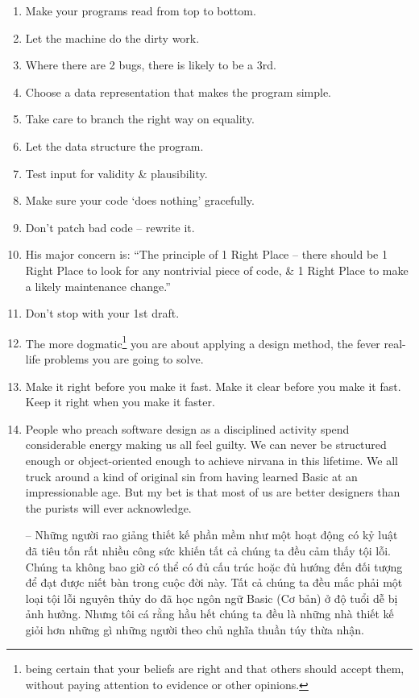 \documentclass{article}
\begin{document}
\begin{enumerate}
	\item Make your programs read from top to bottom.
	\item Let the machine do the dirty work.
	\item Where there are 2 bugs, there is likely to be a 3rd.
	\item Choose a data representation that makes the program simple.
	\item Take care to branch the right way on equality.
	\item Let the data structure the program.
	\item Test input for validity \& plausibility.
	\item Make sure your code `does nothing' gracefully.
	\item Don't patch bad code -- rewrite it.
	\item His major concern is: ``The principle of 1 Right Place -- there should be 1 Right Place to look for any nontrivial piece of code, \& 1 Right Place to make a likely maintenance change.''
	\item Don't stop with your 1st draft.
	\item The more dogmatic\footnote{being certain that your beliefs are right and that others should accept them, without paying attention to evidence or other opinions.} you are about applying a design method, the fever real-life problems you are going to solve.
	\item Make it right before you make it fast. Make it clear before you make it fast. Keep it right when you make it faster.
	\item People who preach software design as a disciplined activity spend considerable energy making us all feel guilty. We can never be structured enough or object-oriented enough to achieve nirvana in this lifetime. We all truck around a kind of original sin from having learned Basic at an impressionable age. But my bet is that most of us are better designers than the purists will ever acknowledge.
	
	-- Những người rao giảng thiết kế phần mềm như một hoạt động có kỷ luật đã tiêu tốn rất nhiều công sức khiến tất cả chúng ta đều cảm thấy tội lỗi. Chúng ta không bao giờ có thể có đủ cấu trúc hoặc đủ hướng đến đối tượng để đạt được niết bàn trong cuộc đời này. Tất cả chúng ta đều mắc phải một loại tội lỗi nguyên thủy do đã học ngôn ngữ Basic (Cơ bản) ở độ tuổi dễ bị ảnh hưởng. Nhưng tôi cá rằng hầu hết chúng ta đều là những nhà thiết kế giỏi hơn những gì những người theo chủ nghĩa thuần túy thừa nhận.
\end{enumerate}
\end{document}
